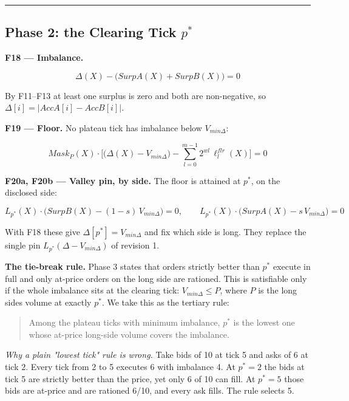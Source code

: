 \begin{center}\rule{0.5\linewidth}{0.5pt}\end{center}

\subsection{\texorpdfstring{Phase 2: the Clearing Tick \(p^*\)}{Phase 2: the Clearing Tick p\^{}*}}

\textbf{F18 --- Imbalance.}

\[\Delta(X) - \big(SurpA(X) + SurpB(X)\big) = 0\]

By F11--F13 at least one surplus is zero and both are non-negative, so \(\Delta[i] = |AccA[i] - AccB[i]|\).

\textbf{F19 --- Floor.} No plateau tick has imbalance below \(V_{min\Delta}\):

\[Mask_P(X) \cdot \Big[\big(\Delta(X) - V_{min\Delta}\big) - \sum_{l=0}^{m-1} 2^{wl}\, \ell^{flr}_l(X)\Big] = 0\]

\textbf{F20a, F20b --- Valley pin, by side.} The floor is attained at \(p^*\), on the disclosed side:

\[L_{p^*}(X) \cdot \big(SurpB(X) - (1-s)\,V_{min\Delta}\big) = 0, \qquad L_{p^*}(X) \cdot \big(SurpA(X) - s\,V_{min\Delta}\big) = 0\]

With F18 these give \(\Delta[p^*] = V_{min\Delta}\) and fix which side is long. They replace the single pin \(L_{p^*}(\Delta - V_{min\Delta})\) of revision 1.

\textbf{The tie-break rule.} Phase 3 states that orders strictly better than \(p^*\) execute in full and only at-price orders on the long side are rationed. This is satisfiable only if the whole imbalance sits at the clearing tick: \(V_{min\Delta} \le P\), where \(P\) is the long side\textquotesingle s volume at exactly \(p^*\). We take this as the tertiary rule:

\begin{quote}
Among the plateau ticks with minimum imbalance, \(p^*\) is the lowest one whose at-price long-side volume covers the imbalance.
\end{quote}

\emph{Why a plain "lowest tick" rule is wrong.} Take bids of 10 at tick 5 and asks of 6 at tick 2. Every tick from 2 to 5 executes 6 with imbalance 4. At \(p^* = 2\) the bids at tick 5 are strictly better than the price, yet only 6 of 10 can fill. At \(p^* = 5\) those bids are at-price and are rationed 6/10, and every ask fills. The rule selects 5.

